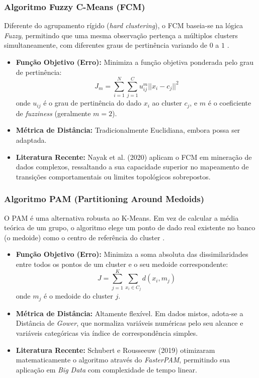 \documentclass[12pt]{article}
\begin{document}
\subsubsection{Algoritmo Fuzzy C-Means (FCM)}
Diferente do agrupamento rígido (\textit{hard clustering}), o FCM baseia-se na lógica \textit{Fuzzy}, permitindo que uma mesma observação pertença a múltiplos clusters simultaneamente, com diferentes graus de pertinência variando de $0$ a $1$ \cite{bezdek1981pattern}.
\begin{itemize}
    \item \textbf{Função Objetivo (Erro):} Minimiza a função objetiva ponderada pelo grau de pertinência:
    $$ J_m = \sum_{i=1}^{N} \sum_{j=1}^{C} u_{ij}^m ||x_i - c_j||^2 $$
    onde $u_{ij}$ é o grau de pertinência do dado $x_i$ ao cluster $c_j$, e $m$ é o coeficiente de \textit{fuzziness} (geralmente $m=2$).
    \item \textbf{Métrica de Distância:} Tradicionalmente Euclidiana, embora possa ser adaptada.
    \item \textbf{Literatura Recente:} Nayak et al. (2020) \cite{nayak2020fuzzy} aplicam o FCM em mineração de dados complexos, ressaltando a sua capacidade superior no mapeamento de transições comportamentais ou limites topológicos sobrepostos.
\end{itemize}

\subsubsection{Algoritmo PAM (Partitioning Around Medoids)}
O PAM é uma alternativa robusta ao K-Means. Em vez de calcular a média teórica de um grupo, o algoritmo elege um ponto de dado real existente no banco (o medoide) como o centro de referência do cluster \cite{kaufman1990finding}.
\begin{itemize}
    \item \textbf{Função Objetivo (Erro):} Minimiza a soma absoluta das dissimilaridades entre todos os pontos de um cluster e o seu medoide correspondente:
    $$ J = \sum_{j=1}^{K} \sum_{x_i \in C_j} d(x_i, m_j) $$
    onde $m_j$ é o medoide do cluster $j$.
    \item \textbf{Métrica de Distância:} Altamente flexível. Em dados mistos, adota-se a Distância de \textit{Gower}, que normaliza variáveis numéricas pelo seu alcance e variáveis categóricas via índice de correspondência simples.
    \item \textbf{Literatura Recente:} Schubert e Rousseeuw (2019) \cite{schubert2019faster} otimizaram matematicamente o algoritmo através do \textit{FasterPAM}, permitindo sua aplicação em \textit{Big Data} com complexidade de tempo linear.
\end{itemize}
\end{document}
